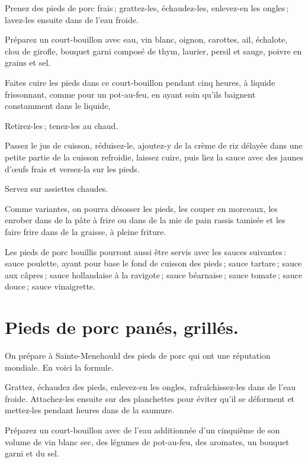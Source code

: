 Prenez des pieds de porc frais ; grattez-les, échaudez-les, enlevez-en les
ongles ; lavez-les ensuite dans de l’eau froide.

Préparez un court-bouillon avec eau, vin blanc, oignon, carottes, ail, échalote,
clou de girofle, bouquet garni composé de thym, laurier, persil et sauge, poivre
en grains et sel.

Faites cuire les pieds dans ce court-bouillon pendant cinq heures, à liquide
frissonnant, comme pour un pot-au-feu, en ayant soin qu'ils baignent
constamment dans le liquide,

Retirez-les ; tenez-les au chaud.

Passez le jus de cuisson, réduisez-le, ajoutez-y de la crème de riz délayée
dans une petite partie de la cuisson refroidie, laissez cuire, puis liez la
sauce avec des jaunes d'œufs frais et versez-la sur les pieds.

Servez sur assiettes chaudes.

\sk

Comme variantes, on pourra désosser les pieds, les couper en morceaux, les
enrober dans de la pâte à frire ou dans de la mie de pain rassis tamisée et les
faire frire dans de la graisse, à pleine friture.

\sk

Les pieds de porc bouillis pourront aussi être servis avec les sauces
suivantes : sauce poulette, ayant pour base le fond de cuisson des pieds ;
sauce tartare ; sauce aux câpres ; sauce hollandaise à la ravigote ; sauce
béarnaise ; sauce tomate ; sauce douce ; sauce vinaigrette.

\section*{\centering Pieds de porc panés, grillés.}
{}

On prépare à Sainte-Menehould des pieds de porc qui ont une réputation
mondiale. En voici la formule.

Grattez, échaudez des pieds, enlevez-en les ongles, rafraîchissez-les dans de
l'eau froide. Attachez-les ensuite sur des planchettes pour éviter qu'il se
déforment et mettez-les pendant {\mmm} heures dans de la saumure.

Préparez un court-bouillon avec de l'eau additionnée d'un cinquième de son
volume de vin blanc sec, des légumes de pot-au-feu, des aromates, un bouquet
garni et du sel.

